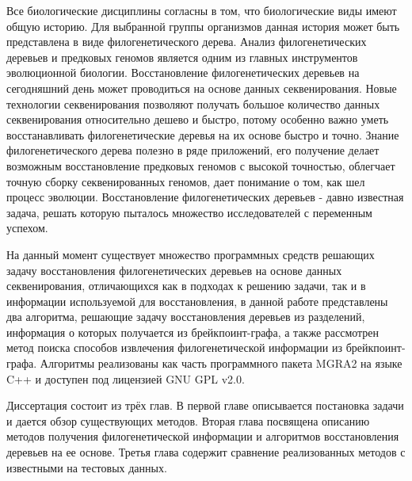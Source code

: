 \intro

Все биологические дисциплины согласны в том, что биологические виды имеют общую историю.
Для выбранной группы организмов данная история может быть представлена в виде филогенетического дерева.
Анализ филогенетических деревьев и предковых геномов является одним из главных инструментов эволюционной биологии.
Восстановление филогенетических деревьев на сегодняшний день может проводиться на основе данных секвенирования.
Новые технологии секвенирования позволяют получать большое количество данных секвенирования относительно дешево и быстро,
потому особенно важно уметь восстанавливать филогенетические деревья на их основе быстро и точно.
Знание филогенетического дерева полезно в ряде приложений, его получение делает возможным восстановление предковых геномов с высокой точностью,
облегчает точную сборку секвенированных геномов, дает понимание о том, как шел процесс эволюции.
Восстановление филогенетических деревьев - давно известная задача, решать которую пыталось множество исследователей с переменным успехом.

На данный момент существует множество программных средств решающих задачу восстановления филогенетических деревьев на основе данных
секвенирования, отличающихся как в подходах к решению задачи, так и в информации используемой для восстановления,
в данной работе представлены два алгоритма, решающие задачу восстановления деревьев из разделений, информация о которых получается из брейкпоинт-графа,
а также рассмотрен метод поиска способов извлечения филогенетической информации из брейкпоинт-графа.
Алгоритмы реализованы как часть программного пакета MGRA2 на языке C++ и доступен под лицензией GNU GPL v2.0.

Диссертация состоит из трёх глав.
В первой главе описывается постановка задачи и дается обзор существующих методов.
Вторая глава посвящена описанию методов получения филогенетической информации и алгоритмов восстановления деревьев на ее основе.
Третья глава содержит сравнение реализованных методов с известными на тестовых данных.
